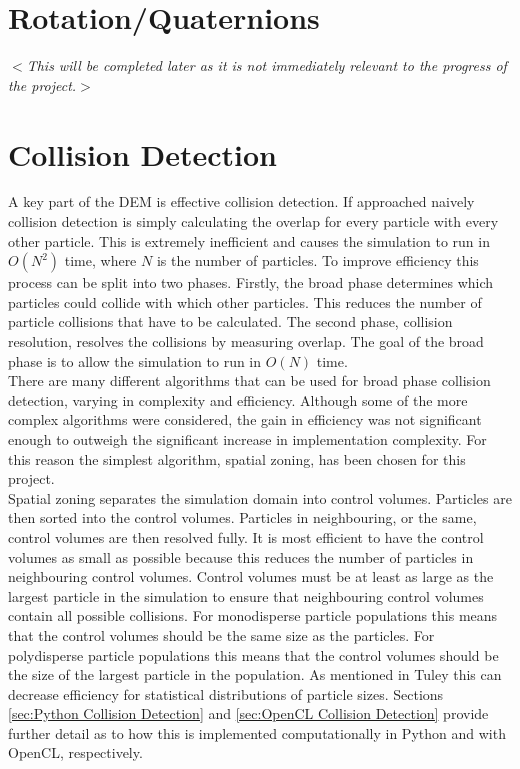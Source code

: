 \documentclass[10pt,a4paper,titlepage]{report}
\begin{document}
\section{Rotation/Quaternions}
\textit{$<$This will be completed later as it is not immediately relevant to the progress of the project.$>$}
\section{Collision Detection}
A key part of the DEM is effective collision detection. If approached naively collision detection is simply calculating the overlap for every particle with every other particle. This is extremely inefficient and causes the simulation to run in $O(N^2)$ time, where $N$ is the number of particles. To improve efficiency this process can be split into two phases. Firstly, the broad phase determines which particles could collide with which other particles. This reduces the number of particle collisions that have to be calculated. The second phase, collision resolution, resolves the collisions by measuring overlap. The goal of the broad phase is to allow the simulation to run in $O(N)$ time.
\\There are many different algorithms that can be used for broad phase collision detection, varying in complexity and efficiency. Although some of the more complex algorithms were considered, the gain in efficiency was not significant enough to outweigh the significant increase in implementation complexity. For this reason the simplest algorithm, spatial zoning, has been chosen for this project.
\\Spatial zoning separates the simulation domain into control volumes. Particles are then sorted into the control volumes. Particles in neighbouring, or the same, control volumes are then resolved fully. It is most efficient to have the control volumes as small as possible because this reduces the number of particles in neighbouring control volumes. Control volumes must be at least as large as the largest particle in the simulation to ensure that neighbouring control volumes contain all possible collisions. For monodisperse particle populations this means that the control volumes should be the same size as the particles. For polydisperse particle populations this means that the control volumes should be the size of the largest particle in the population. As mentioned in Tuley\cite{tuley} this can decrease efficiency for statistical distributions of particle sizes. Sections \ref{sec:Python Collision Detection} and \ref{sec:OpenCL Collision Detection} provide further detail as to how this is implemented computationally in Python and with OpenCL, respectively.
\end{document}
